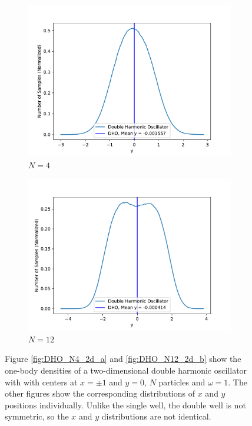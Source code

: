 \documentclass[../main.tex]{subfiles}
\begin{document}
\begin{figure}[!ht]
\medskip
\begin{subfigure}{0.48\textwidth}
\includegraphics[width=\linewidth]{figures/densityDHO/density_DHO_N4_Omega1_2d_y}
\caption{$N=4$} \label{fig:DHO_N4_2d_y_e}
\end{subfigure}\hspace*{\fill}
\begin{subfigure}{0.48\textwidth}
\includegraphics[width=\linewidth]{figures/densityDHO/density_DHO_N12_Omega1_2d_y}
\caption{$N=12$} \label{fig:DHO_N12_2d_y_f}
\end{subfigure}

\caption{Figure \ref{fig:DHO_N4_2d_a} and \ref{fig:DHO_N12_2d_b} show the one-body densities of a two-dimensional double harmonic oscillator with with centers at $x=\pm1$ and $y=0$, $N$ particles and $\omega=1$. The other figures show the corresponding distributions of $x$ and $y$ positions individually. Unlike the single well, the double well is not symmetric, so the $x$ and $y$ distributions are not identical.} \label{fig:DHO_density2d}
\end{figure}
\end{document}
